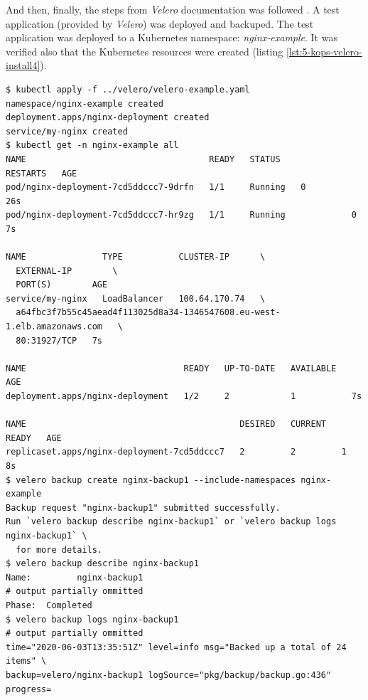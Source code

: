 And then, finally, the steps from \textit{Velero} documentation was followed \cite{velero-examples}. A test application (provided by \textit{Velero}) was deployed and backuped. The test application was deployed to a Kubernetes namespace: \textit{nginx-example}.   It was verified also that the Kubernetes resources were created (listing \ref{lst:5-kops-velero-install4}).
\begin{lstlisting}[basicstyle=\scriptsize,xleftmargin=0cm,label=lst:5-kops-velero-install4,caption={Testing backup operation}]
$ kubectl apply -f ../velero/velero-example.yaml
namespace/nginx-example created
deployment.apps/nginx-deployment created
service/my-nginx created
$ kubectl get -n nginx-example all
NAME                                    READY   STATUS              RESTARTS   AGE
pod/nginx-deployment-7cd5ddccc7-9drfn   1/1     Running   0          26s
pod/nginx-deployment-7cd5ddccc7-hr9zg   1/1     Running             0          7s

NAME               TYPE           CLUSTER-IP      \
  EXTERNAL-IP        \
  PORT(S)        AGE
service/my-nginx   LoadBalancer   100.64.170.74   \
  a64fbc3f7b55c45aead4f113025d8a34-1346547608.eu-west-1.elb.amazonaws.com   \
  80:31927/TCP   7s

NAME                               READY   UP-TO-DATE   AVAILABLE   AGE
deployment.apps/nginx-deployment   1/2     2            1           7s

NAME                                          DESIRED   CURRENT   READY   AGE
replicaset.apps/nginx-deployment-7cd5ddccc7   2         2         1       8s
$ velero backup create nginx-backup1 --include-namespaces nginx-example
Backup request "nginx-backup1" submitted successfully.
Run `velero backup describe nginx-backup1` or `velero backup logs nginx-backup1` \
  for more details.
$ velero backup describe nginx-backup1
Name:         nginx-backup1
# output partially ommitted
Phase:  Completed
$ velero backup logs nginx-backup1
# output partially ommitted
time="2020-06-03T13:35:51Z" level=info msg="Backed up a total of 24 items" \
backup=velero/nginx-backup1 logSource="pkg/backup/backup.go:436" progress=
\end{lstlisting}

